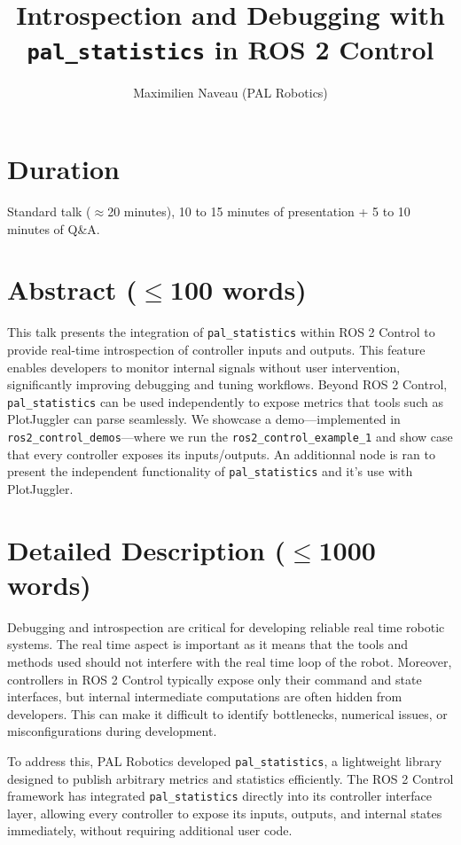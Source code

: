 \documentclass[11pt,a4paper]{article}
\title{Introspection and Debugging with \texttt{pal\_statistics} in ROS 2 Control}
\author{Maximilien Naveau (PAL Robotics)}
\date{}
\begin{document}
\maketitle

\section*{Duration}
Standard talk ($\approx$20 minutes), 10 to 15 minutes of presentation + 5 to 10 minutes of Q\&A.

\section*{Abstract ($\leq$100 words)}
This talk presents the integration of \texttt{pal\_statistics} within ROS 2 Control
to provide real-time introspection of controller inputs and outputs. This feature
enables developers to monitor internal signals without user intervention,
significantly improving debugging and tuning workflows. Beyond ROS 2 Control,
\texttt{pal\_statistics} can be used independently to expose metrics that tools
such as PlotJuggler can parse seamlessly. We showcase a demo—implemented in
\texttt{ros2\_control\_demos}—where we run the \texttt{ros2\_control\_example\_1} and show case that every
controller exposes its inputs/outputs. An additionnal node is ran to present the
independent functionality of \texttt{pal\_statistics} and it's use with PlotJuggler.

\section*{Detailed Description ($\leq$1000 words)}
Debugging and introspection are critical for developing reliable real time robotic
systems.
The real time aspect is important as it means that the tools and methods used
should not interfere with the real time loop of the robot.
Moreover, controllers in ROS 2 Control typically expose only their command and state
interfaces, but internal intermediate computations are often hidden from
developers. This can make it difficult to identify bottlenecks, numerical issues,
or misconfigurations during development.

To address this, PAL Robotics developed \texttt{pal\_statistics}, a lightweight
library designed to publish arbitrary metrics and statistics efficiently. The ROS
2 Control framework has integrated \texttt{pal\_statistics} directly into its
controller interface layer, allowing every controller to expose its inputs,
outputs, and internal states immediately, without requiring additional user code.
\end{document}

